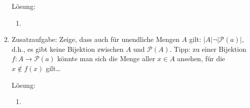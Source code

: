 \documentclass[main.tex]{subfiles}
\begin{document}
\begin{enumerate}
	      Lösung:
	      \begin{enumerate}
		      \item
	      \end{enumerate}
	\item  Zusatzaufgabe: Zeige, dass auch für unendliche Mengen \( A \) gilt: \( |A| \neg |\mathcal{P}(a)| \),
	      d.h., es gibt keine Bijektion zwischen \( A \) und \( \mathcal{P}(A) \).
	      Tipp: zu einer Bijektion \( f: A \rightarrow \mathcal{P}(a) \) könnte man sich die Menge aller
	      \( x \in A \) ansehen, für die \( x \notin f(x) \) gilt\dots

	      Lösung:
	      \begin{enumerate}
		      \item
	      \end{enumerate}
\end{enumerate}
\end{document}

